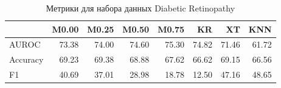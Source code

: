 \begin{table}
\caption{Метрики для набора данных Diabetic Retinopathy}
\label{tab:Diabetic Retinopathy}
\begin{tabular}{lrrrrrrr}
\toprule
 & M0.00 & M0.25 & M0.50 & M0.75 & KR & XT & KNN \\
\midrule
AUROC & 73.38 & 74.00 & 74.60 & 75.30 & 74.82 & 71.46 & 61.72 \\
Accuracy & 69.23 & 69.38 & 68.88 & 67.62 & 66.62 & 69.15 & 66.56 \\
F1 & 40.69 & 37.01 & 28.98 & 18.78 & 12.50 & 47.16 & 48.65 \\
\bottomrule
\end{tabular}
\end{table}
